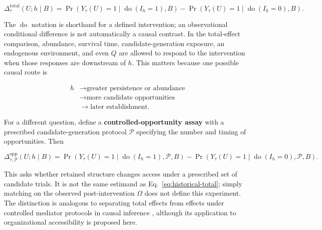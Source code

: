 \documentclass[11pt,a4paper]{article}
\begin{document}
\begin{equation}
\boxed{
\Delta_\tau^{\mathrm{total}}(U;h\mid B)
=
\Pr\!\left(Y_\tau(U)=1\mid\operatorname{do}(I_h=1),B\right)
-
\Pr\!\left(Y_\tau(U)=1\mid\operatorname{do}(I_h=0),B\right).
}
\label{eq:historical-total}
\end{equation}

The $\operatorname{do}$ notation is shorthand for a defined intervention; an observational conditional difference is not automatically a causal contrast. In the total-effect comparison, abundance, survival time, candidate-generation exposure, an endogenous environment, and even $Q$ are allowed to respond to the intervention when those responses are downstream of $h$. This matters because one possible causal route is

\[
\begin{aligned}
h&\to\text{greater persistence or abundance}\\
 &\to\text{more candidate opportunities}\\
 &\to\text{later establishment}.
\end{aligned}
\]

For a different question, define a \textbf{controlled-opportunity assay} with a prescribed candidate-generation protocol $\mathcal P$ specifying the number and timing of opportunities. Then

\begin{equation}
\Delta_{\tau,\mathcal P}^{\mathrm{opp}}(U;h\mid B)
=
\Pr\!\left(Y_\tau(U)=1\mid\operatorname{do}(I_h=1),\mathcal P,B\right)
-
\Pr\!\left(Y_\tau(U)=1\mid\operatorname{do}(I_h=0),\mathcal P,B\right).
\label{eq:historical-controlled}
\end{equation}

This asks whether retained structure changes access under a prescribed set of candidate trials. It is not the same estimand as Eq.~\eqref{eq:historical-total}; simply matching on the observed post-intervention $\Omega$ does not define this experiment. The distinction is analogous to separating total effects from effects under controlled mediator protocols in causal inference \citep{VanderWeele2014}, although its application to organizational accessibility is proposed here.
\end{document}
